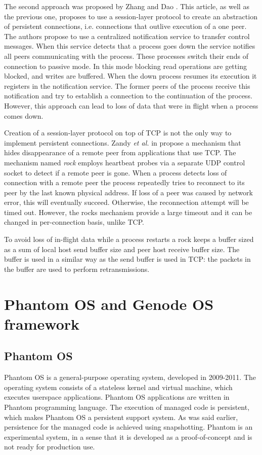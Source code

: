The second approach was proposed by Zhang and Dao \cite{zhang1995persistent}.
This article, as well as the previous one, proposes to use a session-layer
protocol to create an abstraction of persistent connections, i.e. connections
that outlive execution of a one peer. The authors propose to use a centralized
notification service to transfer control messages. When this service detects
that a process goes down the service notifies all peers communicating with the
process. These processes switch their ends of connection to passive mode. In
this mode blocking read operations are getting blocked, and writes are buffered.
When the down process resumes its execution it registers in the notification
service. The former peers of the process receive this notification and try to
establish a connection to the continuation of the process. However, this
approach can lead to loss of data that were in flight when a process comes down.

Creation of a session-layer protocol on top of TCP is not the only way to
implement persistent connections. Zandy \textit{et al.} in \cite{rocks_racks}
propose a mechanism that hides disappearance of a remote peer from applications
that use TCP. The mechanism named \textit{rock} employs heartbeat probes via a
separate UDP control socket to detect if a remote peer is gone. When a process
detects loss of connection with a remote peer the process repeatedly tries to
reconnect to its peer by the last known physical address. If loss of a peer was
caused by network error, this will eventually succeed. Otherwise, the
reconnection attempt will be timed out. However, the rocks mechanism provide
a large timeout and it can be changed in per-connection basis, unlike TCP. 

To avoid loss of in-flight data while a process restarts a rock keeps a buffer
sized as a sum of local host send buffer size and peer host receive buffer
size. The buffer is used in a similar way as the send buffer is used in TCP:
the packets in the buffer are used to perform retransmissions.

\section{Phantom OS and Genode OS framework}
\subsection{Phantom OS}

Phantom OS is a general-purpose operating system, developed in 2009-2011. The
operating system consists of a stateless kernel and virtual machine, which
executes userspace applications. Phantom OS applications are written in Phantom
programming language. The execution of managed code is persistent, which makes
Phantom OS a persistent support system. As was said earlier, persistence for the
managed code is achieved using snapshotting. Phantom is an experimental system,
in a sense that it is developed as a proof-of-concept and is not ready for
production use.

